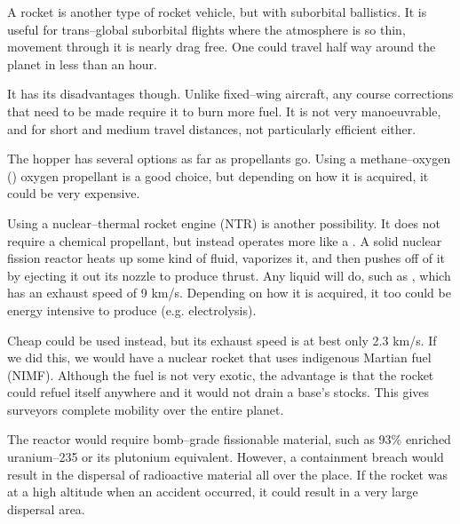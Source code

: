 A rocket  is another type of rocket vehicle, but with suborbital ballistics. It is useful for trans--global suborbital flights where the atmosphere is so thin, movement through it is nearly drag free. One could travel half way around the planet in less than an hour. 

It has its disadvantages though. Unlike fixed--wing aircraft, any course corrections that need to be made require it to burn more fuel. It is not very manoeuvrable, and for short and medium travel distances, not particularly efficient either.

The hopper has several options as far as propellants go. Using a methane--oxygen ()  oxygen propellant is a good choice, but depending on how it is acquired, it could be very expensive.

Using a nuclear--thermal rocket engine (NTR) is another possibility. It does not require a chemical propellant, but instead operates more like a . A solid nuclear fission reactor heats up some kind of fluid, vaporizes it, and then pushes off of it by ejecting it out its nozzle to produce thrust. Any liquid will do, such as , which has an exhaust speed of 9 km/s. Depending on how it is acquired, it too could be energy intensive to produce (e.g. electrolysis).

Cheap  could be used instead, but its exhaust speed is at best only 2.3 km/s. If we did this, we would have a nuclear rocket that uses indigenous Martian fuel (NIMF). Although the fuel is not very exotic, the advantage is that the rocket could refuel itself anywhere and it would not drain a base's  stocks. This gives surveyors complete mobility over the entire planet.

The reactor would require bomb--grade fissionable material, such as 93\% enriched uranium--235 or its plutonium equivalent. However, a containment breach would result in the dispersal of radioactive material all over the place. If the rocket was at a high altitude when an accident occurred, it could result in a very large dispersal area.

